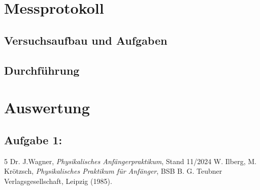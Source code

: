 \documentclass[12pt,a4paper,titlepage]{scrartcl}
\numberwithin{equation}{section}
\numberwithin{table}{section}
\numberwithin{figure}{section}
\begin{document}
\section{Messprotokoll}

\subsection{Versuchsaufbau und Aufgaben}

\subsection{Durchführung}

\section{Auswertung}

\subsection{Aufgabe 1: }




\clearpage

\listoffigures


\listoftables

\begin{thebibliography}{5}
     Dr. J.Wagner, \emph{Physikalisches Anfängerpraktikum}, Stand 11/2024
     W. Ilberg, M. Krötzsch, \emph{Physikalisches Praktikum für Anfänger}, BSB B. G. Teubner Verlagsgesellschaft, Leipzig (1985).
\end{thebibliography}

\end{document}
